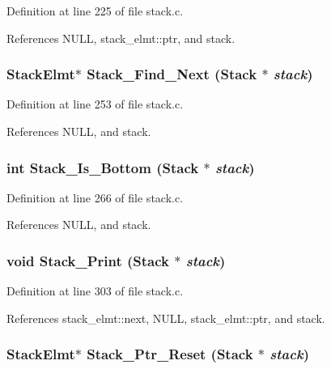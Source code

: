 Definition at line 225 of file stack.c.

References NULL, stack\_\-elmt::ptr, and stack.
\subsubsection{\setlength{\rightskip}{0pt plus 5cm}\bf{Stack\-Elmt}$\ast$ Stack\_\-Find\_\-Next (\bf{Stack} $\ast$ {\em stack})}\label{stack_8c_ff8a51625133db1301411bce55048f97}




Definition at line 253 of file stack.c.

References NULL, and stack.
\subsubsection{\setlength{\rightskip}{0pt plus 5cm}int Stack\_\-Is\_\-Bottom (\bf{Stack} $\ast$ {\em stack})}\label{stack_8c_0a61e5feb26a8730092fe0be365eaa55}




Definition at line 266 of file stack.c.

References NULL, and stack.
\subsubsection{\setlength{\rightskip}{0pt plus 5cm}void Stack\_\-Print (\bf{Stack} $\ast$ {\em stack})}\label{stack_8c_5e4010a7a8c631ff5d602f6c78d65828}




Definition at line 303 of file stack.c.

References stack\_\-elmt::next, NULL, stack\_\-elmt::ptr, and stack.
\subsubsection{\setlength{\rightskip}{0pt plus 5cm}\bf{Stack\-Elmt}$\ast$ Stack\_\-Ptr\_\-Reset (\bf{Stack} $\ast$ {\em stack})}\label{stack_8c_9f54527c882b81a04f60705b652e2375}





